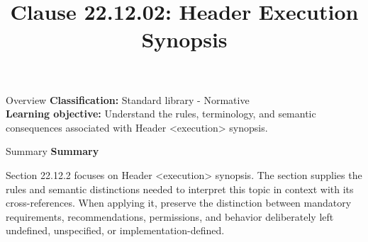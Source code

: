 \documentclass[10pt,letterpaper]{article}
\title{Clause 22.12.02: Header Execution Synopsis}
\author{}
\date{}
\begin{document}
\maketitle
\begin{CornellOverviewBox}{Overview}
\textbf{Classification:} Standard library - Normative\\[2pt]
\textbf{Learning objective:} Understand the rules, terminology, and semantic consequences associated with Header <execution> synopsis.
\end{CornellOverviewBox}\begin{CornellSummaryBox}{Summary}
{\sffamily\bfseries\color{Accent} Summary}\par\vspace{3pt}Section 22.12.2 focuses on Header <execution> synopsis. The section supplies the rules and semantic distinctions needed to interpret this topic in context with its cross-references. When applying it, preserve the distinction between mandatory requirements, recommendations, permissions, and behavior deliberately left undefined, unspecified, or implementation-defined.
\end{CornellSummaryBox}
\end{document}
